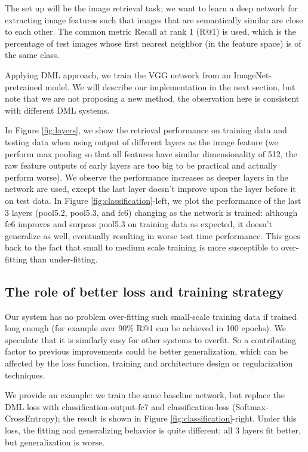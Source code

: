\documentclass[10pt,twocolumn,letterpaper]{article}
\begin{document}
The set up will be the image retrieval task; we want to learn a deep network for extracting image features such that images that are semantically similar are close to each other.
The common metric Recall at rank 1 (R@1) is used, which is the percentage of test images whose first nearest neighbor (in the feature space) is of the same class.

Applying DML approach, we train the VGG network from an ImageNet-pretrained model. We will describe our implementation in the next section, but note that we are not proposing a new method, the observation here is consistent with different DML systems. 

In Figure \ref{fig:layers}, we show the retrieval performance on training data and testing data when using output of different layers as the image feature (we perform max pooling so that all features have similar dimensionality of 512, the raw feature outputs of early layers are too big to be practical and actually perform worse). We observe the performance increases as deeper layers in the network are used, except the last layer doesn't improve upon the layer before it on test data. In Figure \ref{fig:classification}-left, we plot the performance of the last 3 layers (pool5.2, pool5.3, and fc6) changing as the network is trained: although fc6 improves and surpass pool5.3 on training data as expected, it doesn't generalize as well, eventually resulting in worse test time performance. This goes back to the fact that small to medium scale training is more susceptible to over-fitting than under-fitting.


\subsection{The role of better loss and training strategy}





Our system has no problem over-fitting such small-scale training data if trained long enough (for example over 90\% R@1 can be achieved in 100 epochs). We speculate that it is similarly easy for other systems to overfit. So a contributing factor to previous improvements could be better generalization, which can be affected by the loss function, training and architecture design or regularization techniques.

We provide an example: we train the same baseline network, but replace the DML loss with classification-output-fc7 and classification-loss (Softmax-CrossEntropy); the result is shown in Figure \ref{fig:classification}-right. Under this loss, the fitting and generalizing behavior is quite different: all 3 layers fit better, but generalization is worse.
\end{document}
